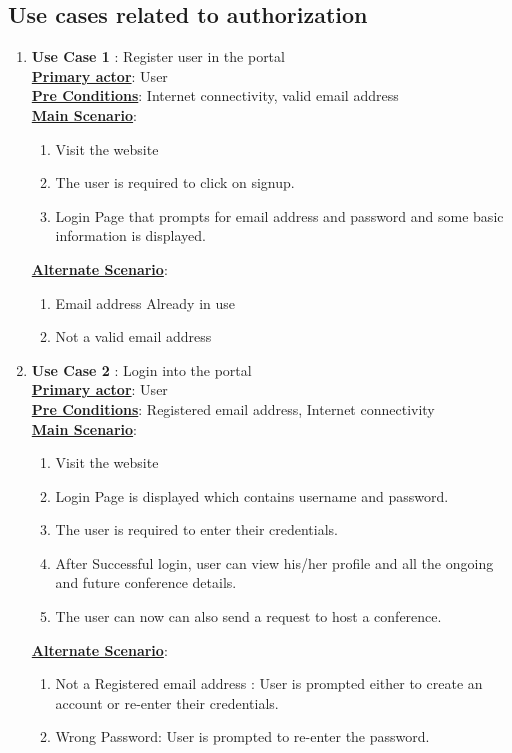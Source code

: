 \documentclass[english,a4paper,12pt]{report}
\begin{document}
\subsection{Use cases related to authorization}
\begin{enumerate}
    \item \textbf{Use Case 1 }: Register user in the portal \\
\underline{\textbf{Primary actor}}: User \\
\underline{\textbf{Pre Conditions}}: Internet connectivity, valid email address\\
\underline{\textbf{Main Scenario}}:
\begin{enumerate}
    \item Visit the website
    \item The user is required to click on signup.
    \item Login Page that prompts for email address and password and some basic information is displayed.
\end{enumerate}
\underline{\textbf{Alternate Scenario}}:
\begin{enumerate}
    \item Email address Already in use
    \item Not a valid email address
\end{enumerate}

\item \textbf{Use Case 2 }: Login into the portal \\
\underline{\textbf{Primary actor}}: User \\
\underline{\textbf{Pre Conditions}}: Registered email address, Internet connectivity\\
\underline{\textbf{Main Scenario}}:
\begin{enumerate}
    \item Visit the website
    \item Login Page is displayed which contains username and password.
    \item The user is required to enter their credentials.
    \item After Successful login, user can view his/her profile and  all the ongoing and future conference details.
    \item The user can now  can also send a request to host a conference.
\end{enumerate}
\underline{\textbf{Alternate Scenario}}:
\begin{enumerate}
    \item Not a Registered email address : User is prompted either to create an account or re-enter their credentials.
    \item Wrong Password: User is prompted to re-enter the password.
\end{enumerate}



\end{enumerate}
\end{document}
